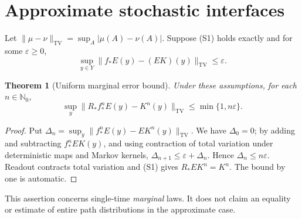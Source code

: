 \documentclass[11pt,letterpaper]{article}
\newtheorem{theorem}{Theorem}[section]
\theoremstyle{definition}\newtheorem{definition}[theorem]{Definition}
\theoremstyle{remark}\newtheorem{remark}[theorem]{Remark}
\newcommand{\N}{\mathbb{N}}
\newcommand{\TV}{\mathrm{TV}}
\begin{document}
\section{Approximate stochastic interfaces}
Let $\|\mu-\nu\|_{\TV}=\sup_A|\mu(A)-\nu(A)|$. Suppose (S1) holds exactly and for some $\varepsilon\ge0$,
\begin{equation}\label{eq:approx}
\sup_{y\in Y}\|f_*E(y)-(EK)(y)\|_{\TV}\le\varepsilon.
\end{equation}
\begin{theorem}[Uniform marginal error bound]\label{thm:approx}
Under these assumptions, for each $n\in\N_0$,
\[
\sup_y\|R_*f_*^n E(y)-K^n(y)\|_{\TV}\le\min\{1,n\varepsilon\}.
\]
\end{theorem}
\begin{proof}
Put $\Delta_n=\sup_y\|f_*^nE(y)-EK^n(y)\|_{\TV}$. We have $\Delta_0=0$; by adding and subtracting $f_*^nEK(y)$, and using contraction of total variation under deterministic maps and Markov kernels, $\Delta_{n+1}\le\varepsilon+\Delta_n$. Hence $\Delta_n\le n\varepsilon$. Readout contracts total variation and (S1) gives $R_*EK^n=K^n$. The bound by one is automatic.
\end{proof}
This assertion concerns single-time \emph{marginal} laws. It does not claim an equality or estimate of entire path distributions in the approximate case.
\end{document}
